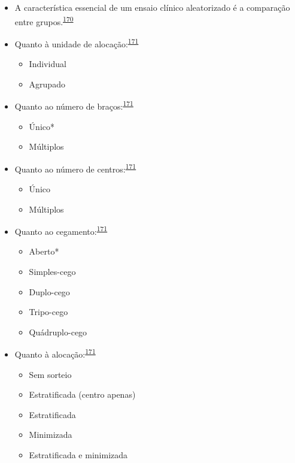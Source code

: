\documentclass[
  a4paper,
]{book}
\begin{document}
\begin{itemize}
\item
  A característica essencial de um ensaio clínico aleatorizado é a comparação entre grupos.\textsuperscript{\protect\hyperlink{ref-bland2011}{170}}
\item
  Quanto à unidade de alocação:\textsuperscript{\protect\hyperlink{ref-Bruce2022}{171}}

  \begin{itemize}
  \item
    Individual
  \item
    Agrupado
  \end{itemize}
\item
  Quanto ao número de braços:\textsuperscript{\protect\hyperlink{ref-Bruce2022}{171}}

  \begin{itemize}
  \item
    Único*
  \item
    Múltiplos
  \end{itemize}
\item
  Quanto ao número de centros:\textsuperscript{\protect\hyperlink{ref-Bruce2022}{171}}

  \begin{itemize}
  \item
    Único
  \item
    Múltiplos
  \end{itemize}
\item
  Quanto ao cegamento:\textsuperscript{\protect\hyperlink{ref-Bruce2022}{171}}

  \begin{itemize}
  \item
    Aberto*
  \item
    Simples-cego
  \item
    Duplo-cego
  \item
    Tripo-cego
  \item
    Quádruplo-cego
  \end{itemize}
\item
  Quanto à alocação:\textsuperscript{\protect\hyperlink{ref-Bruce2022}{171}}

  \begin{itemize}
  \item
    Sem sorteio
  \item
    Estratificada (centro apenas)
  \item
    Estratificada
  \item
    Minimizada
  \item
    Estratificada e minimizada
  \end{itemize}
\end{itemize}
\end{document}
